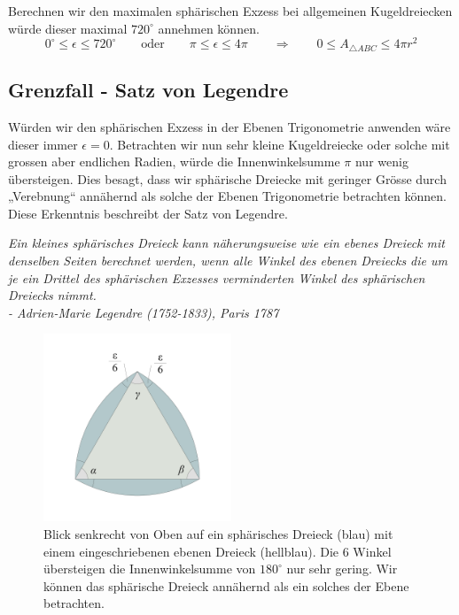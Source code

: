\begin{refsection}
Berechnen wir den maximalen sphärischen Exzess bei allgemeinen Kugeldreiecken würde dieser maximal $720^{\circ}$ annehmen können.
\[
0^{\circ} \le \epsilon \le 720^{\circ}
\qquad \text{oder} \qquad
\pi \le \epsilon \le 4\pi
\qquad \Rightarrow \qquad
0 \le A_{\triangle{ ABC }} \le 4 \pi r^2
\]


\subsection{Grenzfall - Satz von Legendre}
Würden wir den sphärischen Exzess in der Ebenen Trigonometrie anwenden wäre dieser immer $\epsilon=0$. Betrachten wir nun sehr kleine Kugeldreiecke oder solche mit grossen aber endlichen Radien, würde die Innenwinkelsumme $\pi$ nur wenig übersteigen. Dies besagt, dass wir sphärische Dreiecke mit geringer Grösse durch „Verebnung“ annähernd als solche der Ebenen Trigonometrie betrachten können. Diese Erkenntnis beschreibt der Satz von Legendre.

\begin{satz}\textit{Ein kleines sphärisches Dreieck kann näherungsweise 
wie ein ebenes Dreieck mit denselben Seiten berechnet 
werden, wenn alle Winkel des ebenen Dreiecks die um 
je ein Drittel des sphärischen Exzesses verminderten 
Winkel des sphärischen Dreiecks nimmt. \\
\quad \quad - Adrien-Marie Legendre (1752-1833), Paris 1787}
\label{skript:kugel:satz:Legendre}
\end{satz}

\begin{figure}[htbp]
\centering
\includegraphics[width=0.5\textwidth]{kugel/SphaerischerExzess.jpg}
\caption{Blick senkrecht von Oben auf ein sphärisches Dreieck (blau) mit einem eingeschriebenen ebenen Dreieck (hellblau). Die 6 Winkel übersteigen die Innenwinkelsumme von $180^{\circ}$ nur sehr gering. Wir können das sphärische Dreieck annähernd als ein solches der Ebene betrachten.}
\end{figure}


\end{refsection}

